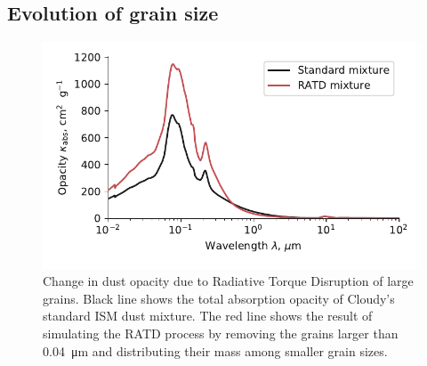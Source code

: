 \subsection{Evolution of grain size}
\label{sec:evolution-grain-size}

\begin{figure}
  \centering
  \includegraphics[width=\linewidth]{figs/xsec-dust-ratd-ism_10}
  \caption{Change in dust opacity due to Radiative Torque Disruption
    of large grains.  Black line shows the total absorption opacity of
    Cloudy's standard ISM dust mixture.  The red line shows the result
    of simulating the RATD process by removing the grains larger than
    \SI{0.04}{\um} and distributing their mass among smaller grain
    sizes.}
  \label{fig:ratd}
\end{figure}


